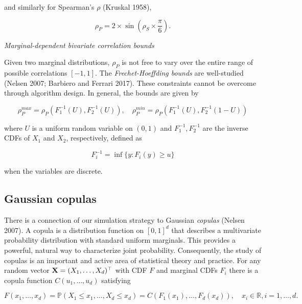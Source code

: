 \documentclass{article}
\begin{document}
\noindent and similarly for Spearman's \(\rho\) (Kruskal 1958),

\begin{equation}
\label{eq:convertSpearman}
\rho_P = 2 \times \sin \left( \rho_S \times \frac{\pi}{6} \right).
\end{equation}

\emph{Marginal-dependent bivariate correlation bounds}

Given two marginal distributions, \(\rho_P\) is not free to vary over
the entire range of possible correlations \([-1,1]\). The
\emph{Frechet-Hoeffding bounds} are well-studied (Nelsen 2007; Barbiero
and Ferrari 2017). These constraints cannot be overcome through
algorithm design. In general, the bounds are given by

\begin{equation}
\label{eq:frechet}
\rho_P^{max} = \rho_P \left( F^{-1}_1 (U), F^{-1}_2 (U) \right), \quad \rho_P^{min} = \rho_P \left( F^{-1}_1 (U), F^{-1}_2 (1 - U) \right)
\end{equation}

\noindent where \(U\) is a uniform random variable on \((0,1)\) and
\(F^{-1}_1, F^{-1}_2\) are the inverse CDFs of \(X_1\) and \(X_2\),
respectively, defined as

\begin{equation}
F_{i}^{-1} = \inf\{y:F_{i}(y) \geq u \}
\label{eq:inverseCDF}
\end{equation}

when the variables are discrete.

\hypertarget{gaussian-copulas}{%
\subsection{Gaussian copulas}\label{gaussian-copulas}}

There is a connection of our simulation strategy to Gaussian
\emph{copulas} (Nelsen 2007). A copula is a distribution function on
\([0,1]^d\) that describes a multivariate probability distribution with
standard uniform marginals. This provides a powerful, natural way to
characterize joint probability. Consequently, the study of copulas is an
important and active area of statistical theory and practice. For any
random vector \({\bf X}=(X_1, \ldots, X_d)^\top\) with CDF \(F\) and
marginal CDFs \(F_i\) there is a copula function \(C(u_1, \ldots, u_d)\)
satisfying

\begin{equation}
F(x_1, \ldots, x_d) = {\mathbb P}(X_1\leq x_1, \ldots,X_d\leq x_d) = C(F_1(x_1), \ldots, F_d(x_d)), \quad x_i \in {\mathbb R}, i=1,\ldots,d.
\label{eq:copula}
\end{equation}
\end{document}
